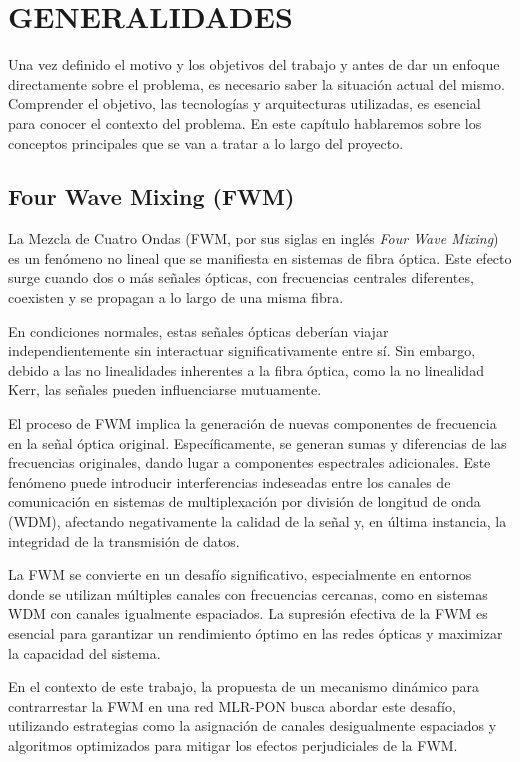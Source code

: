\chapter[GENERALIDADES]{\Large GENERALIDADES}
\label{chap1:generalidades}
\justify %

Una vez definido el motivo y los objetivos del trabajo y antes de dar un enfoque
directamente sobre el problema, es necesario saber la situación actual del mismo.
Comprender el objetivo, las tecnologías y arquitecturas utilizadas, es esencial para conocer el contexto del problema. En este capítulo hablaremos sobre los conceptos principales que se van a tratar a lo largo del proyecto.



\section{Four Wave Mixing (FWM)}
La Mezcla de Cuatro Ondas (FWM, por sus siglas en inglés \textit{Four Wave Mixing}) es un fenómeno no lineal que se manifiesta en sistemas de fibra óptica. Este efecto surge cuando dos o más señales ópticas, con frecuencias centrales diferentes, coexisten y se propagan a lo largo de una misma fibra.

En condiciones normales, estas señales ópticas deberían viajar independientemente sin interactuar significativamente entre sí. Sin embargo, debido a las no linealidades inherentes a la fibra óptica, como la no linealidad Kerr, las señales pueden influenciarse mutuamente.

El proceso de FWM implica la generación de nuevas componentes de frecuencia en la señal óptica original. Específicamente, se generan sumas y diferencias de las frecuencias originales, dando lugar a componentes espectrales adicionales. Este fenómeno puede introducir interferencias indeseadas entre los canales de comunicación en sistemas de multiplexación por división de longitud de onda (WDM), afectando negativamente la calidad de la señal y, en última instancia, la integridad de la transmisión de datos.

La FWM se convierte en un desafío significativo, especialmente en entornos donde se utilizan múltiples canales con frecuencias cercanas, como en sistemas WDM con canales igualmente espaciados. La supresión efectiva de la FWM es esencial para garantizar un rendimiento óptimo en las redes ópticas y maximizar la capacidad del sistema.

En el contexto de este trabajo, la propuesta de un mecanismo dinámico para contrarrestar la FWM en una red MLR-PON busca abordar este desafío, utilizando estrategias como la asignación de canales desigualmente espaciados y algoritmos optimizados para mitigar los efectos perjudiciales de la FWM.


